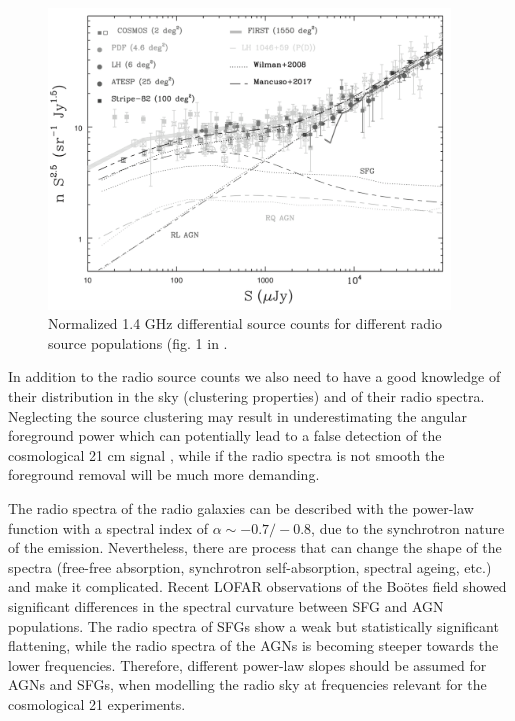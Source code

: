 \begin{figure}[!t]
   \centering
    \includegraphics[width=0.95\textwidth]{Chapman_Jelic/Images/extragal.png}
    \caption{Normalized 1.4 GHz differential source counts for different radio source populations (fig. 1 in \cite{prandoniIAUS333}.}
    \label{fig:extragal}
\end{figure}

In addition to the radio source counts we also need to have a good knowledge of their distribution in the sky (clustering properties) and of their radio spectra. Neglecting the source clustering may result in underestimating the angular foreground power which can potentially lead to a false detection of the cosmological 21 cm signal \cite{murray17, murray18}, while if the radio spectra is not smooth the foreground removal will be much more demanding.

The radio spectra of the radio galaxies can be described with the power-law function with a spectral index of  $\alpha\sim-0.7/-0.8$, due to the synchrotron nature of the emission.  Nevertheless, there are process that can change the shape of the spectra (free-free absorption, synchrotron self-absorption, spectral ageing, etc.) and make it complicated. Recent  LOFAR observations of the Bo\"otes field \cite{calistrorivera17} showed significant differences in the spectral curvature between SFG and AGN populations. The radio spectra of SFGs show a weak but statistically significant flattening, while the radio spectra of the AGNs is becoming steeper towards  the lower frequencies. Therefore, different power-law slopes should be assumed for AGNs and SFGs, when modelling the radio sky at frequencies relevant for the cosmological 21 experiments.

